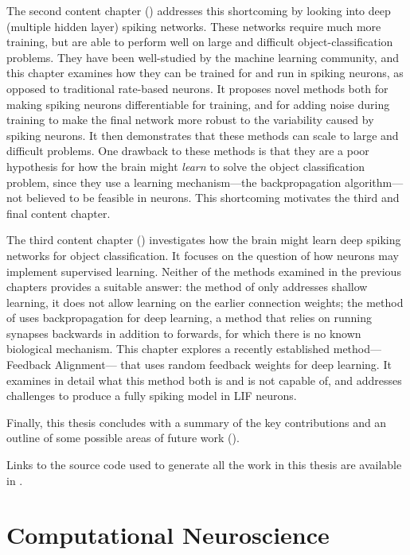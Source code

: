 The second content chapter () addresses this shortcoming
by looking into deep (multiple hidden layer) spiking networks.
These networks require much more training,
but are able to perform well on large and difficult object-classification problems.
They have been well-studied by the machine learning community,
and this chapter examines how they can be trained for and run in spiking neurons,
as opposed to traditional rate-based neurons.
It proposes novel methods both for making spiking neurons differentiable for training,
and for adding noise during training to make the final network
more robust to the variability caused by spiking neurons.
It then demonstrates that these methods can scale to large and difficult problems.
One drawback to these methods is that they are a poor hypothesis for how
the brain might \emph{learn} to solve the object classification problem,
since they use a learning mechanism---the backpropagation algorithm---%
not believed to be feasible in neurons.
This shortcoming motivates the third and final content chapter.

The third content chapter ()
investigates how the brain might learn
deep spiking networks for object classification.
It focuses on the question of how neurons may implement supervised learning.
Neither of the methods examined in the previous chapters
provides a suitable answer:
the method of  only addresses shallow learning,
it does not allow learning on the earlier connection weights;
the method of  uses backpropagation for deep learning,
a method that relies on running synapses backwards in addition to forwards,
for which there is no known biological mechanism.
This chapter explores a recently established method---%
Feedback Alignment---%
that uses random feedback weights for deep learning.
It examines in detail what this method both is and is not capable of,
and addresses challenges to produce a fully spiking model in LIF neurons.

Finally, this thesis concludes
with a summary of the key contributions
and an outline of some possible areas of future work ().

Links to the source code used to generate all the work in this thesis
are available in .


\chapter{Computational Neuroscience}


